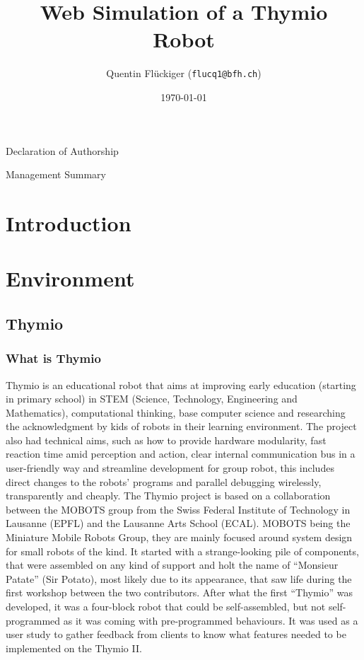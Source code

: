 \documentclass{scrartcl}
\begin{document}
\title{Web Simulation of a Thymio Robot}
\date{\today}   %
\author{Quentin Flückiger (\texttt{flucq1@bfh.ch})}

\clearpage

Declaration of Authorship
\clearpage

Management Summary
\clearpage

\maketitle
\tableofcontents
\clearpage

\section{Introduction}

\section{Environment}

\subsection{Thymio}
\subsubsection{What is Thymio} 

Thymio is an educational robot that aims at improving early education (starting in primary school) in STEM (Science, Technology, Engineering and Mathematics), computational thinking, base computer science and researching the acknowledgment by kids of robots in their learning environment. The project also had technical aims, such as how to provide hardware modularity, fast reaction time amid perception and action, clear internal communication bus in a user-friendly way and streamline development for group robot, this includes direct changes to the robots’ programs and parallel debugging wirelessly, transparently and cheaply.
The Thymio project is based on a collaboration between the MOBOTS group from the Swiss Federal Institute of Technology in Lausanne (EPFL) and the Lausanne Arts School (ECAL). MOBOTS being the Miniature Mobile Robots Group, they are mainly focused around system design for small robots of the kind. It started with a strange-looking pile of components, that were assembled on any kind of support and holt the name of “Monsieur Patate” (Sir Potato), most likely due to its appearance, that saw life during the first workshop between the two contributors. After what the first “Thymio” was developed, it was a four-block robot that could be self-assembled, but not self-programmed as it was coming with pre-programmed behaviours. It was used as a user study to gather feedback from clients to know what features needed to be implemented on the Thymio II.
\end{document}
